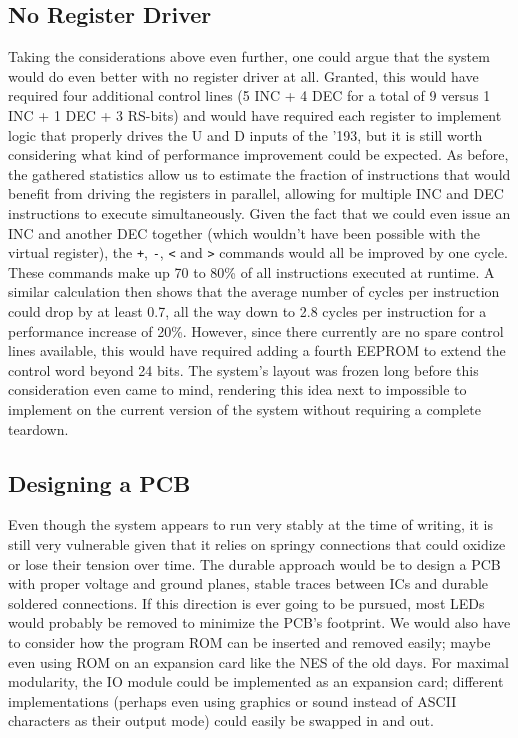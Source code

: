 \subsection{No Register Driver} Taking the considerations above even further, one could argue that the system would do even better with no register driver at all. Granted, this would have required four additional control lines (5 INC + 4 DEC for a total of 9 versus 1 INC + 1 DEC + 3 RS-bits) and would have required each register to implement logic that properly drives the U and D inputs of the '193, but it is still worth considering what kind of performance improvement could be expected. As before, the gathered statistics allow us to estimate the fraction of instructions that would benefit from driving the registers in parallel, allowing for multiple INC and DEC instructions to execute simultaneously. Given the fact that we could even issue an INC and another DEC together (which wouldn't have been possible with the virtual register), the \texttt{+}, \texttt{-}, \texttt{<} and \texttt{>} commands would all be improved by one cycle. These commands make up 70 to 80\% of all instructions executed at runtime. A similar calculation then shows that the average number of cycles per instruction could drop by at least 0.7, all the way down to 2.8 cycles per instruction for a performance increase of 20\%. However, since there currently are no spare control lines available, this would have required adding a fourth EEPROM to extend the control word beyond 24 bits. The system's layout was frozen long before this consideration even came to mind, rendering this idea next to impossible to implement on the current version of the system without requiring a complete teardown.

\subsection{Designing a PCB} Even though the system appears to run very stably at the time of writing, it is still very vulnerable given that it relies on springy connections that could oxidize or lose their tension over time. The durable approach would be to design a PCB with proper voltage and ground planes, stable traces between ICs and durable soldered connections. If this direction is ever going to be pursued, most LEDs would probably be removed to minimize the PCB's footprint. We would also have to consider how the program ROM can be inserted and removed easily; maybe even using ROM on an expansion card like the NES of the old days. For maximal modularity, the IO module could be implemented as an expansion card; different implementations (perhaps even using graphics or sound instead of ASCII characters as their output mode) could easily be swapped in and out.

